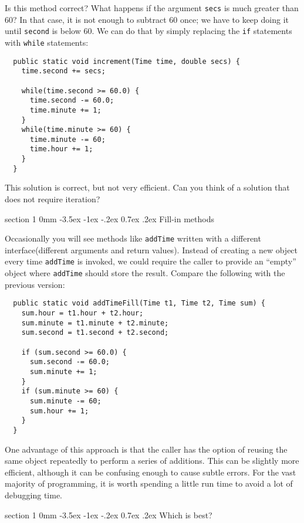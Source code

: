 \documentclass{book}
\makeatletter
\renewcommand{\section}{\@startsection 
    {section} {1} {0mm}%
    {-3.5ex \@plus -1ex \@minus -.2ex}%
    {0.7ex \@plus.2ex}%
    {\normalfont\Large\bfseries}}
\makeatother
\begin{document}
Is this method correct?  What happens if the argument {\tt secs}
is much greater than 60?  In that case, it is not enough to
subtract 60 once; we have to keep doing it until {\tt second}
is below 60.  We can do that by simply replacing the {\tt if}
statements with {\tt while} statements:

\begin{verbatim}
  public static void increment(Time time, double secs) {
    time.second += secs;

    while(time.second >= 60.0) {
      time.second -= 60.0;
      time.minute += 1;
    }
    while(time.minute >= 60) {
      time.minute -= 60;
      time.hour += 1;
    }
  }
\end{verbatim}
%
This solution is correct, but not very efficient.
Can you think of a solution that does not require iteration?

\section{Fill-in methods}

Occasionally you will see methods like {\tt addTime} written
with a different interface(different arguments and return values).
Instead of creating a new object every time {\tt addTime} is
invoked, we could require the caller to provide an ``empty''
object where {\tt addTime} should store the result.  Compare
the following with the previous version:

\begin{verbatim}
  public static void addTimeFill(Time t1, Time t2, Time sum) {
    sum.hour = t1.hour + t2.hour;
    sum.minute = t1.minute + t2.minute;
    sum.second = t1.second + t2.second;

    if (sum.second >= 60.0) {
      sum.second -= 60.0;
      sum.minute += 1;
    }
    if (sum.minute >= 60) {
      sum.minute -= 60;
      sum.hour += 1;
    }
  }
\end{verbatim}
%
One advantage of this approach is that the caller has the option
of reusing the same object repeatedly to perform a series
of additions.  This can be slightly more efficient, although
it can be confusing enough to cause subtle errors.
For the vast majority of programming, it is worth
spending a little run time to avoid a lot of debugging time.

\section{Which is best?}
\end{document}
